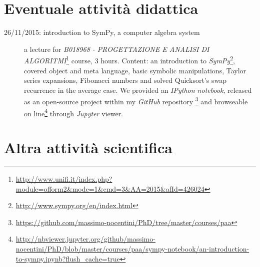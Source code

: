 \documentclass[11pt]{article}
\begin{document}
\section*{Eventuale attivit\`a didattica}

\begin{description}

\item[26/11/2015: introduction to SymPy, a computer algebra system] a lecture for 
    \emph{B018968 - PROGETTAZIONE E ANALISI DI ALGORITMI}\footnote{\url{http://www.unifi.it/index.php?module=ofform2\&mode=1\&cmd=3\&AA=2015\&afId=426024}} 
    course, 3 hours. Content: an introduction to 
    \emph{SymPy}\footnote{\url{http://www.sympy.org/en/index.html}}, covered object and meta language, basic symbolic 
    manipulations, Taylor series expansions, Fibonacci numbers and solved Quicksort's swap recurrence
    in the average case. We provided an \emph{IPython notebook}, released as an open-source project within
    my \emph{GitHub} repository \footnote{\url{https://github.com/massimo-nocentini/PhD/tree/master/courses/paa}}
    and browseable on line\footnote{\url{http://nbviewer.jupyter.org/github/massimo-nocentini/PhD/blob/master/courses/paa/sympy-notebook/an-introduction-to-sympy.ipynb?flush\_cache=true}} 
    through \emph{Jupyter} viewer.

\end{description}

\section*{Altra attivit\`a scientifica}
\end{document}
